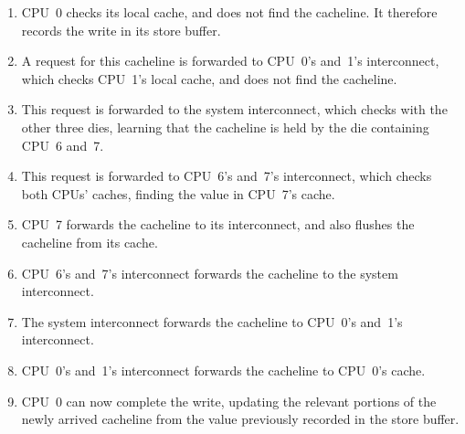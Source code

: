 \begin{enumerate}
\item	CPU~0 checks its local cache, and does not find the cacheline.
	It therefore records the write in its store buffer.
\item	A request for this cacheline is forwarded to CPU~0's and~1's
	interconnect, which checks CPU~1's local cache, and does not
	find the cacheline.
\item	This request is forwarded to the system interconnect, which
	checks with the other three dies, learning that the cacheline
	is held by the die containing CPU~6 and~7.
\item	This request is forwarded to CPU~6's and~7's interconnect, which
	checks both CPUs' caches, finding the value in CPU~7's cache.
\item	CPU~7 forwards the cacheline to its interconnect, and also
	flushes the cacheline from its cache.
\item	CPU~6's and~7's interconnect forwards the cacheline to the
	system interconnect.
\item	The system interconnect forwards the cacheline to CPU~0's and~1's
	interconnect.
\item	CPU~0's and~1's interconnect forwards the cacheline to CPU~0's
	cache.
\item	CPU~0 can now complete the write, updating the relevant portions
	of the newly arrived cacheline from the value previously
	recorded in the store buffer.
\end{enumerate}

